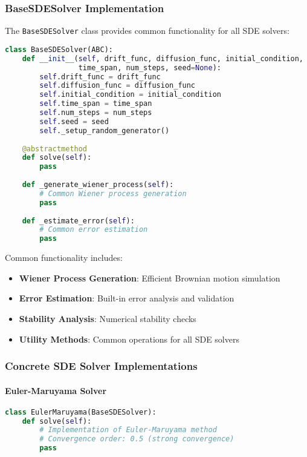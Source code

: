 \subsubsection{BaseSDESolver Implementation}

The \texttt{BaseSDESolver} class provides common functionality for all SDE solvers:

\begin{lstlisting}[language=Python, caption=BaseSDESolver Base Class]
class BaseSDESolver(ABC):
    def __init__(self, drift_func, diffusion_func, initial_condition,
                 time_span, num_steps, seed=None):
        self.drift_func = drift_func
        self.diffusion_func = diffusion_func
        self.initial_condition = initial_condition
        self.time_span = time_span
        self.num_steps = num_steps
        self.seed = seed
        self._setup_random_generator()
    
    @abstractmethod
    def solve(self):
        pass
    
    def _generate_wiener_process(self):
        # Common Wiener process generation
        pass
    
    def _estimate_error(self):
        # Common error estimation
        pass
\end{lstlisting}

Common functionality includes:
\begin{itemize}
    \item \textbf{Wiener Process Generation}: Efficient Brownian motion simulation
    \item \textbf{Error Estimation}: Built-in error analysis and validation
    \item \textbf{Stability Analysis}: Numerical stability checks
    \item \textbf{Utility Methods}: Common operations for all SDE solvers
\end{itemize}

\subsubsection{Concrete SDE Solver Implementations}

\paragraph{Euler-Maruyama Solver}
\begin{lstlisting}[language=Python, caption=EulerMaruyama Implementation]
class EulerMaruyama(BaseSDESolver):
    def solve(self):
        # Implementation of Euler-Maruyama method
        # Convergence order: 0.5 (strong convergence)
        pass
\end{lstlisting}

